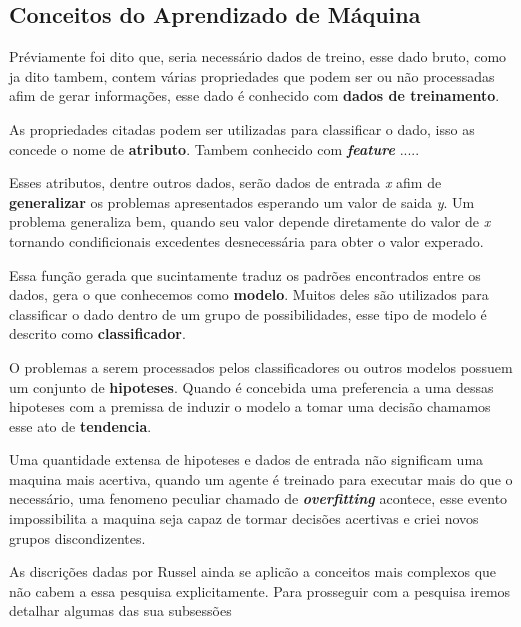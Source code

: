 \subsection{Conceitos do Aprendizado de Máquina}
Préviamente foi dito que, seria necessário dados de treino, esse dado bruto, como ja dito tambem, contem várias propriedades que podem ser ou não processadas afim de gerar informações, esse dado é conhecido com \textbf{dados de treinamento}.

As propriedades citadas podem ser utilizadas para classificar o dado, isso as concede o nome de \textbf{atributo}. Tambem conhecido com \textbf{\textit{feature}} .....

Esses atributos, dentre outros dados, serão dados de entrada \textit{x} afim de \textbf{generalizar} os problemas apresentados esperando um valor de saida \textit{y}. Um problema generaliza bem, quando seu valor depende diretamente do valor de \textit{x} tornando condificionais excedentes desnecessária para obter o valor experado.

Essa função gerada que sucintamente traduz os padrões encontrados entre os dados, gera o que conhecemos como \textbf{modelo}. Muitos deles são utilizados para classificar o dado dentro de um grupo de possibilidades, esse tipo de modelo é descrito como \textbf{classificador}.

O problemas a serem processados pelos classificadores ou outros modelos possuem um conjunto de \textbf{hipoteses}. Quando é concebida uma preferencia a uma dessas hipoteses com a premissa de induzir o modelo a tomar uma decisão chamamos esse ato de \textbf{tendencia}.

Uma quantidade extensa de hipoteses e dados de entrada não significam uma maquina mais acertiva, quando um agente é treinado para executar mais do que o necessário, uma fenomeno peculiar chamado de \textbf{\textit{overfitting}} acontece, esse evento impossibilita a maquina seja capaz de tormar decisões acertivas e criei novos grupos discondizentes.

As discrições dadas por Russel \cite[693]{russell2003artificial} ainda se aplicão a conceitos mais complexos que não cabem a essa pesquisa explicitamente. Para prosseguir com a pesquisa iremos detalhar algumas das sua subsessões 